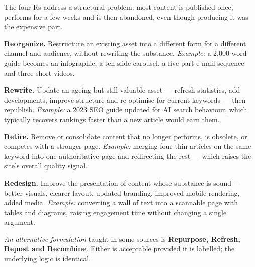 \begin{qlist}
The four Rs address a structural problem: most content is published once,
performs for a few weeks and is then abandoned, even though producing it was
the expensive part.

\begin{apts}
\item \textbf{Reorganize.} Restructure an existing asset into a different form
      for a different channel and audience, without rewriting the substance.
      \emph{Example:} a 2{,}000-word guide becomes an infographic, a
      ten-slide carousel, a five-part e-mail sequence and three short videos.
\item \textbf{Rewrite.} Update an ageing but still valuable asset --- refresh
      statistics, add developments, improve structure and re-optimise for
      current keywords --- then republish. \emph{Example:} a 2023 SEO guide
      updated for AI search behaviour, which typically recovers rankings faster
      than a new article would earn them.
\item \textbf{Retire.} Remove or consolidate content that no longer performs, is
      obsolete, or competes with a stronger page. \emph{Example:} merging four
      thin articles on the same keyword into one authoritative page and
      redirecting the rest --- which raises the site's overall quality signal.
\item \textbf{Redesign.} Improve the presentation of content whose substance is
      sound --- better visuals, clearer layout, updated branding, improved
      mobile rendering, added media. \emph{Example:} converting a wall of text
      into a scannable page with tables and diagrams, raising engagement time
      without changing a single argument.
\end{apts}

\textit{An alternative formulation} taught in some sources is \textbf{Repurpose,
Refresh, Repost and Recombine}. Either is acceptable provided it is labelled;
the underlying logic is identical.


\end{qlist}
